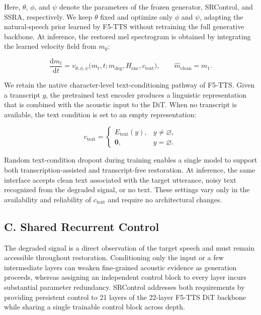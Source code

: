 \documentclass{article}
\begin{document}
Here, $\theta$, $\phi$, and $\psi$ denote the parameters of the frozen generator, SRControl, and SSRA, respectively. We keep $\theta$ fixed and optimize only $\phi$ and $\psi$, adapting the natural-speech prior learned by F5-TTS without retraining the full generative backbone. At inference, the restored mel spectrogram is obtained by integrating the learned velocity field from $m_0$:

\begin{equation}
  \frac{\mathrm{d}m_t}{\mathrm{d}t}
  =v_{\theta,\phi,\psi}\big(m_t,t;
  m_{\mathrm{deg}},H_{\mathrm{enc}},c_{\mathrm{text}}\big),
  \qquad \hat{m}_{\mathrm{clean}}=m_1.
\end{equation}

We retain the native character-level text-conditioning pathway of F5-TTS. Given a transcript $y$, the pretrained text encoder produces a linguistic representation that is combined with the acoustic input to the DiT. When no transcript is available, the text condition is set to an empty representation:

\begin{equation}
  c_{\mathrm{text}}=
  \begin{cases}
    E_{\mathrm{text}}(y), & y\neq\varnothing,\\
    \mathbf{0}, & y=\varnothing.
  \end{cases}
\end{equation}

Random text-condition dropout during training enables a single model to support both transcription-assisted and transcript-free restoration. At inference, the same interface accepts clean text associated with the target utterance, noisy text recognized from the degraded signal, or no text. These settings vary only in the availability and reliability of $c_{\mathrm{text}}$ and require no architectural changes.

\subsection{C. Shared Recurrent Control}

The degraded signal is a direct observation of the target speech and must remain accessible throughout restoration. Conditioning only the input or a few intermediate layers can weaken fine-grained acoustic evidence as generation proceeds, whereas assigning an independent control block to every layer incurs substantial parameter redundancy. SRControl addresses both requirements by providing persistent control to 21 layers of the 22-layer F5-TTS DiT backbone while sharing a single trainable control block across depth.
\end{document}
